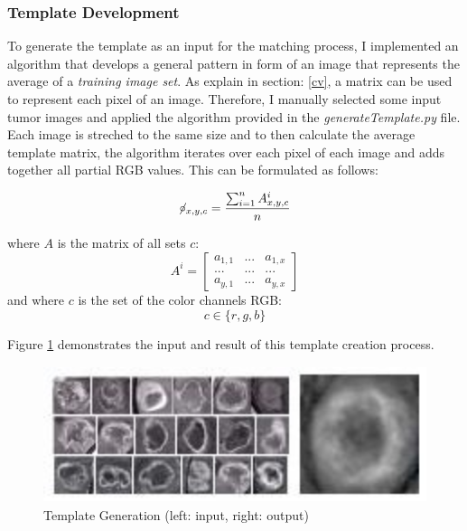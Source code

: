 \documentclass[twoside,11pt]{article}
\begin{document}
\subsubsection{Template Development}
To generate the template as an input for the matching process, I implemented an algorithm that develops a general pattern in form of an image that represents the average of a \textit{training image set}. As explain in section: \ref{cv}, a matrix can be used to represent each pixel of an image. Therefore, I manually selected some input tumor images and applied the algorithm provided in the \textit{generateTemplate.py} file. Each image is streched to the same size and to then calculate the average template matrix, the algorithm iterates over each pixel of each image and adds together all partial RGB values. This can be formulated as follows: 

$$
\not\!\circ_{x,y,c} = \frac{\sum_{i=1}^{n} A_{x,y,c}^{i}}{n}
$$

where $A$ is the matrix of all sets $c$:
\[
A^{i}=
\begin{bmatrix}
a_{1,1} & ... & a_{1,x}\\ 
... & ... & ... \\ 
a_{y,1} & ... & a_{y,x}
\end{bmatrix}
\]
and where $c$ is the set of the color channels RGB:
$$
c \in \{r,g,b\}
$$

Figure \ref{fig:template-generation} demonstrates the input and result of this template creation process.

\begin{figure}
	\label{fig:template-generation}
	\centering
	\includegraphics[height=4cm]{template-generation}
	\caption{Template Generation (left: input, right: output)}
\end{figure}%


\end{document}
